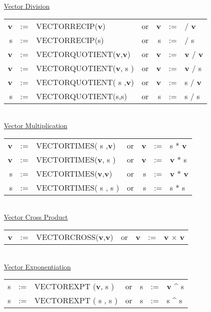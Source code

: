 \underline{Vector Division}\\
  
\begin{tabular}{rclcrcl}
{\bf v} &:=& VECTORRECIP({\bf v})  &{\rm or}& {\bf v} &:=&  /  
{\bf v} \\
 s  &:=& VECTORRECIP(s)  &{\rm or} &      s  &:=&  /       s  \\
{\bf v} &:=& VECTORQUOTIENT({\bf v},{\bf v})  &{\rm or }& {\bf v} &:=&  
{\bf v} /  {\bf v} \\
{\bf v} &:=& VECTORQUOTIENT({\bf v},    s  )  &{\rm or }& {\bf v} &:=&  
{\bf v} /     s    \\
{\bf v} &:=& VECTORQUOTIENT(   s   ,{\bf v})  &{\rm or }& {\bf v} &:=&  
   s    /  {\bf v} \\
     s  &:=& VECTORQUOTIENT(s,s)  &{\rm or }&      s  &:=&  s / s       
       \\
\end{tabular} \\

\underline{Vector Multiplication}\\ 
 
\begin{tabular}{rclcrcl}
{\bf v} &:=& VECTORTIMES(   s   ,{\bf v})  &{\rm or }& {\bf v} &:=&     
s    *  {\bf v} \\
{\bf v} &:=& VECTORTIMES({\bf v},   s   )  &{\rm or }& {\bf v} &:=& {\bf
 v}  *     s    \\
   s    &:=& VECTORTIMES({\bf v},{\bf v})  &{\rm or }&    s    &:=& {\bf
 v}  *  {\bf v} \\
   s    &:=& VECTORTIMES(   s   ,   s   )  &{\rm or }&    s    &:=&     
s    *     s    \\
\end{tabular} \\
 
\underline{Vector Cross Product} \\
  
\begin{tabular}{rclcrcl}
{\bf v} &:=& VECTORCROSS({\bf v},{\bf v})  &{\rm or }& {\bf v} &:=& {\bf
 v} $\times$   {\bf v} \\
\end{tabular} \\
 
\underline{Vector Exponentiation}\\
 
\begin{tabular}{rclcrcl}
   s    &:=& VECTOREXPT ({\bf v},   s   )  &{\rm or }&    s    &:=& {\bf
 v}  \^{} s   \\
   s    &:=& VECTOREXPT (   s   ,   s   )  &{\rm or }&    s    &:=&    s
     \^{} s   \\
\end{tabular} \\

